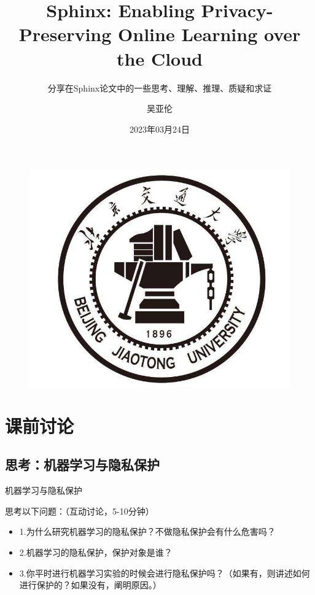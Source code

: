 \documentclass{beamer}
\author{吴亚伦}
\title{Sphinx: Enabling Privacy-Preserving Online Learning over the Cloud}
\subtitle{分享在Sphinx论文中的一些思考、理解、推理、质疑和求证}
\institute{北京交通大学·网络空间安全}
\date{2023年03月24日}
\begin{document}
\kaishu
\begin{frame}
    \titlepage
    \begin{figure}[htpb]
        \begin{center}
            \includegraphics[width=0.2\linewidth]{pic/bjtu_logo.jpeg}
        \end{center}
    \end{figure}
\end{frame}


\begin{frame}
    \tableofcontents[sectionstyle=show,subsectionstyle=show/shaded/hide,subsubsectionstyle=show/shaded/hide]
\end{frame}


\section{课前讨论}
\subsection{思考：机器学习与隐私保护}
\begin{frame}{机器学习与隐私保护}
	\begin{exampleblock}{思考以下问题：（互动讨论，5-10分钟）}
    \begin{itemize}[<+-| alert@+>]
        \item 1.为什么研究机器学习的隐私保护？不做隐私保护会有什么危害吗？
        \item 2.机器学习的隐私保护，保护对象是谁？ 
        \item 3.你平时进行机器学习实验的时候会进行隐私保护吗？（如果有，则讲述如何进行保护的？如果没有，阐明原因。）
    \end{itemize}
    \end{exampleblock}
\end{frame}
\end{document}
